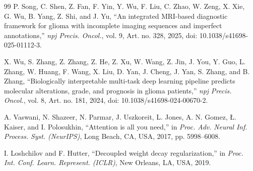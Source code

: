 \begin{thebibliography}{99}
P. Song, C. Shen, Z. Fan, F. Yin, Y. Wu, F. Liu, C. Zhao, W. Zeng, X. Xie, G. Wu, B. Yang, Z. Shi, and J. Yu,
``An integrated MRI-based diagnostic framework for glioma with incomplete imaging sequences and imperfect annotations,''
\textit{npj Precis. Oncol.}, vol. 9, Art. no. 328, 2025, doi: 10.1038/s41698-025-01112-3.

X. Wu, S. Zhang, Z. Zhang, Z. He, Z. Xu, W. Wang, Z. Jin, J. You, Y. Guo, L. Zhang, W. Huang, F. Wang, X. Liu, D. Yan, J. Cheng, J. Yan, S. Zhang, and B. Zhang,
``Biologically interpretable multi-task deep learning pipeline predicts molecular alterations, grade, and prognosis in glioma patients,''
\textit{npj Precis. Oncol.}, vol. 8, Art. no. 181, 2024, doi: 10.1038/s41698-024-00670-2.

A. Vaswani, N. Shazeer, N. Parmar, J. Uszkoreit, L. Jones, A. N. Gomez, {\L}. Kaiser, and I. Polosukhin,
``Attention is all you need,''
in \textit{Proc. Adv. Neural Inf. Process. Syst. (NeurIPS)},
Long Beach, CA, USA, 2017, pp. 5998--6008.

I. Loshchilov and F. Hutter,
``Decoupled weight decay regularization,''
in \textit{Proc. Int. Conf. Learn. Represent. (ICLR)},
New Orleans, LA, USA, 2019.

\end{thebibliography}
